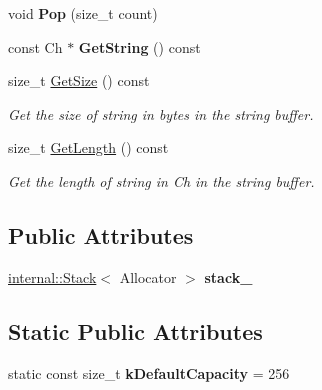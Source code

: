 \begin{DoxyCompactItemize}
\item 
void {\bfseries Pop} (size\+\_\+t count)\hypertarget{classGenericStringBuffer_a0038e53ba03c271bc4cbbac403ec4de4}{}\label{classGenericStringBuffer_a0038e53ba03c271bc4cbbac403ec4de4}

\item 
const Ch $\ast$ {\bfseries Get\+String} () const \hypertarget{classGenericStringBuffer_a42ed917a29012d932802f2709e11c572}{}\label{classGenericStringBuffer_a42ed917a29012d932802f2709e11c572}

\item 
size\+\_\+t \hyperlink{classGenericStringBuffer_abd04725d776322157be3381f5559c40b}{Get\+Size} () const \hypertarget{classGenericStringBuffer_abd04725d776322157be3381f5559c40b}{}\label{classGenericStringBuffer_abd04725d776322157be3381f5559c40b}

\begin{DoxyCompactList}\small\item\em Get the size of string in bytes in the string buffer. \end{DoxyCompactList}\item 
size\+\_\+t \hyperlink{classGenericStringBuffer_a8ad04ebc2bbe46a116613d1ed0d1eeff}{Get\+Length} () const \hypertarget{classGenericStringBuffer_a8ad04ebc2bbe46a116613d1ed0d1eeff}{}\label{classGenericStringBuffer_a8ad04ebc2bbe46a116613d1ed0d1eeff}

\begin{DoxyCompactList}\small\item\em Get the length of string in Ch in the string buffer. \end{DoxyCompactList}\end{DoxyCompactItemize}
\subsection*{Public Attributes}
\begin{DoxyCompactItemize}
\item 
\hyperlink{classinternal_1_1Stack}{internal\+::\+Stack}$<$ Allocator $>$ {\bfseries stack\+\_\+}\hypertarget{classGenericStringBuffer_aaef716643febb9de5957dbf8ff904409}{}\label{classGenericStringBuffer_aaef716643febb9de5957dbf8ff904409}

\end{DoxyCompactItemize}
\subsection*{Static Public Attributes}
\begin{DoxyCompactItemize}
\item 
static const size\+\_\+t {\bfseries k\+Default\+Capacity} = 256\hypertarget{classGenericStringBuffer_ae74f9df854dd5a7db4315ef44b016d22}{}\label{classGenericStringBuffer_ae74f9df854dd5a7db4315ef44b016d22}

\end{DoxyCompactItemize}


